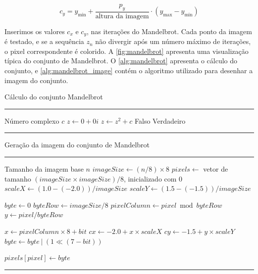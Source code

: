 \begin{equation}
	\label{eq:mandelbrot_cy}
	c_y = y_{\text{min}} + \frac{p_y}{\text{altura da imagem}} \cdot (y_{\text{max}} - y_{\text{min}})
\end{equation}

Inserimos os valores $c_x$ e $c_y$, nas iterações do Mandelbrot. Cada ponto da imagem é testado, e se a sequência $z_n$ não divergir após um número máximo de iterações, o pixel correspondente é colorido. A \autoref{fig:mandelbrot} apresenta uma visualização típica do conjunto de Mandelbrot. O \autoref{alg:mandelbrot} apresenta o cálculo do conjunto, e \autoref{alg:mandelbrot_image} contém o algoritmo utilizado para desenhar a imagem do conjunto.

\begin{algorithm}[htb]
	\caption{Cálculo do conjunto Mandelbrot}
	\label{alg:mandelbrot}
	\hrule
	\begin{algorithmic}[1]
		\REQUIRE Número complexo $c$
		\STATE $z \gets 0 + 0i$
		\STATE $z \gets z^2 + c$
		\RETURN Falso
		\ENDIF
		\ENDFOR
		\RETURN Verdadeiro
	\end{algorithmic}
	\hrule
	\fonte{}
\end{algorithm}

\begin{algorithm}[htb]
	\caption{Geração da imagem do conjunto de Mandelbrot}
	\label{alg:mandelbrot_image}
	\hrule
	\begin{algorithmic}[1]
		\REQUIRE Tamanho da imagem base $n$
		\STATE $imageSize \gets (n / 8) \times 8$
		\STATE $pixels \gets$ vetor de tamanho $(imageSize \times imageSize) / 8$, inicializado com $0$
		\STATE $scaleX \gets (1.0 - (-2.0)) / imageSize$
		\STATE $scaleY \gets (1.5 - (-1.5)) / imageSize$

		\STATE $byte \gets 0$
		\STATE $byteRow \gets imageSize / 8$
		\STATE $pixelColumn \gets pixel \bmod byteRow$
		\STATE $y \gets pixel / byteRow$

		\STATE $x \gets pixelColumn \times 8 + bit$
		\STATE $cx \gets -2.0 + x \times scaleX$
		\STATE $cy \gets -1.5 + y \times scaleY$
		\STATE $byte \gets byte\ |\ (1 \ll (7 - bit))$
		\ENDIF
		\ENDFOR

		\STATE $pixels[pixel] \gets byte$
		\ENDFOR
	\end{algorithmic}
	\hrule
	\fonte{}
\end{algorithm}

